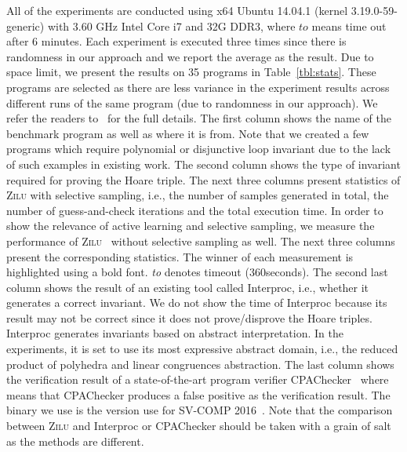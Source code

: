 All of the experiments are conducted using x64 Ubuntu 14.04.1 (kernel 3.19.0-59-generic) with 3.60 GHz Intel Core i7 and 32G DDR3, where $to$ means time out after 6 minutes. Each experiment is executed three times since there is randomness in our approach and we report the average as the result. Due to space limit, we present the results on 35 programs in Table~\ref{tbl:stats}. These programs are selected as there are less variance in the experiment results across different runs of the same program (due to randomness in our approach). We refer the readers to~\cite{zilu:repo} for the full details. The first column shows the name of the benchmark program as well as where it is from. Note that we created a few programs which require polynomial or disjunctive loop invariant due to the lack of such examples in existing work. The second column shows the type of invariant required for proving the Hoare triple. The next three columns present statistics of \textsc{Zilu} with selective sampling, i.e., the number of samples generated in total, the number of guess-and-check iterations and the total execution time. In order to show the relevance of active learning and selective sampling, we measure the performance of \textsc{Zilu}~\cite{zilu:repo} without selective sampling as well. The next three columns present the corresponding statistics. The winner of each measurement is highlighted using a bold font. {\em to} denotes timeout (360seconds).
The second last column shows the result of an existing tool called Interproc, i.e., whether it generates a correct invariant. We do not show the time of Interproc because its result may not be correct since it does not prove/disprove the Hoare triples. Interproc generates invariants based on abstract interpretation. In the experiments, it is set to use its most expressive abstract domain, i.e., the reduced product of polyhedra and linear congruences abstraction.
The last column shows the verification result of a state-of-the-art program verifier CPAChecker~\cite{DBLP:conf/cav/BeyerK11} where  means that CPAChecker produces a false positive as the verification result. The binary we use is the version use for SV-COMP 2016~\cite{Dirk:SVCOMP:2016}. Note that the comparison between \textsc{Zilu} and Interproc or CPAChecker should be taken with a grain of salt as the methods are different.


